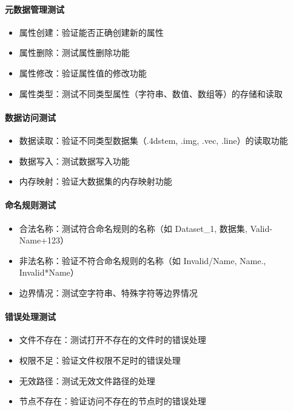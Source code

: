 \documentclass[a4paper,12pt]{report}	%
\begin{document}
\paragraph{元数据管理测试}
\begin{itemize}
    \item 属性创建：验证能否正确创建新的属性
    \item 属性删除：测试属性删除功能
    \item 属性修改：验证属性值的修改功能
    \item 属性类型：测试不同类型属性（字符串、数值、数组等）的存储和读取
\end{itemize}

\paragraph{数据访问测试}
\begin{itemize}
    \item 数据读取：验证不同类型数据集（.4dstem, .img, .vec, .line）的读取功能
    \item 数据写入：测试数据写入功能
    \item 内存映射：验证大数据集的内存映射功能
\end{itemize}

\paragraph{命名规则测试}
\begin{itemize}
    \item 合法名称：测试符合命名规则的名称（如 Dataset\_1, 数据集, Valid-Name+123）
    \item 非法名称：验证不符合命名规则的名称（如 Invalid/Name, Name., Invalid*Name）
    \item 边界情况：测试空字符串、特殊字符等边界情况
\end{itemize}

\paragraph{错误处理测试}
\begin{itemize}
    \item 文件不存在：测试打开不存在的文件时的错误处理
    \item 权限不足：验证文件权限不足时的错误处理
    \item 无效路径：测试无效文件路径的处理
    \item 节点不存在：验证访问不存在的节点时的错误处理
\end{itemize}
\end{document}
